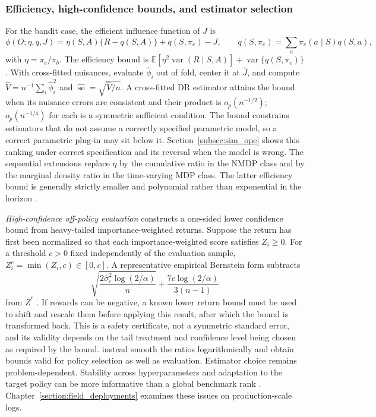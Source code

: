 \subsubsection*{Efficiency, high-confidence bounds, and estimator selection}

For the bandit case, the efficient influence function of $J$ is
\[
\phi(O;\eta,q,J)
=\eta(S,A)\{R-q(S,A)\}
+q(S,\pi_e)-J,
\qquad
q(S,\pi_e)=\sum_a\pi_e(a\mid S)q(S,a),
\]
with $\eta=\pi_e/\pi_b$. The efficiency bound is $\mathbb E[\eta^2\operatorname{var}(R\mid S,A)]+\operatorname{var}\{q(S,\pi_e)\}$ \citep{ueharaShiKallus2022ope}. With cross-fitted nuisances, evaluate $\hat\phi_i$ out of fold, center it at $\hat J$, and compute $\hat V=n^{-1}\sum_i\hat\phi_i^2$ and $\widehat{\operatorname{se}}=\sqrt{\hat V/n}$. A cross-fitted DR estimator attains the bound when its nuisance errors are consistent and their product is $o_p(n^{-1/2})$; $o_p(n^{-1/4})$ for each is a symmetric sufficient condition. The bound constrains estimators that do not assume a correctly specified parametric model, so a correct parametric plug-in may sit below it. Section~\ref{subsec:sim_ope} shows this ranking under correct specification and its reversal when the model is wrong. The sequential extensions replace $\eta$ by the cumulative ratio in the NMDP class and by the marginal density ratio in the time-varying MDP class. The latter efficiency bound is generally strictly smaller and polynomial rather than exponential in the horizon \citep{kallusUehara2022doubleRL}.

\emph{High-confidence off-policy evaluation} constructs a one-sided lower confidence bound from heavy-tailed importance-weighted returns. Suppose the return has first been normalized so that each importance-weighted score satisfies $Z_i\geq0$. For a threshold $c>0$ fixed independently of the evaluation sample, $Z_i^c=\min(Z_i,c)\in[0,c]$. A representative empirical Bernstein form subtracts
\[
\sqrt{\frac{2\hat\sigma_c^2\log(2/\alpha)}{n}}
+\frac{7c\log(2/\alpha)}{3(n-1)}
\]
from $\bar Z^c$ \citep{thomas2015hcope}. If rewards can be negative, a known lower return bound must be used to shift and rescale them before applying this result, after which the bound is transformed back. This is a safety certificate, not a symmetric standard error, and its validity depends on the tail treatment and confidence level being chosen as required by the bound. \citet{sakhi2024logsmoothing} instead smooth the ratios logarithmically and obtain bounds valid for policy selection as well as evaluation. Estimator choice remains problem-dependent. Stability across hyperparameters and adaptation to the target policy can be more informative than a global benchmark rank \citep{saito2021robustope, udagawa2023pas}. Chapter~\ref{section:field_deployments} examines these issues on production-scale logs.

